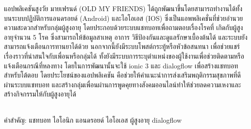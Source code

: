 \begin{thaiabstract}
    แอปพลิเคชันสูงวัย มายเฟรนด์ (OLD MY FRIENDS) ได้ถูกพัฒนาขึ้นโดยสามารถทำงานได้ทั้งบนระบบปฏิบัติการแอนดรอยด์ (Android) และไอโอเอส (IOS) 
    ซึ่งเป็นแอพพลิเคชั่นที่ช่วยอำนวยความสะดวกสำหรับกลุ่มผู้สูงอายุ โดยประกอบด้วยระบบแชทบอทเพื่อถามตอบเรื่องโรคที่
    เกิดกับผู้สูงอายุจำนวน 5 โรค ซึ่งสามารถให้ข้อมูลสาเหตุ อาการ วิธีป้องกันและดูแลรักษาเบื้องต้นได้ 
    และระบบยังสามารถแจ้งเตือนการทานยาได้ด้วย
    นอกจากนี้ยังมีระบบโพสต์กระทู้หรือหัวข้อสนทนา เพื่อช่วยแชร์เรื่องราวที่น่าสนใจกับเพื่อนหรือกลุ่มได้ 
    ทั้งยังมีระบบการระบุตำแหน่งของผู้ใช้งานเพื่อช่วยติดตามหรือแจ้งเตือนกรณีที่หลงทาง โดยในการพัฒนานั้นจะใช้ ionic 3 
    และ dialogflow เพื่อสร้างแชทบอทสำหรับโต้ตอบ โดยประโยชน์ของแอปพลิเคชัน 
    คือช่วยให้คำแนะนำการส่งเสริมพฤติกรรมสุขภาพที่ดีผ่านระบบแชทบอท และสร้างกลุ่มเพื่อนผ่านการพูดคุยทางสังคมออนไลน์ทำให้ช่วยลดความเหงาและสร้างกิจกรรมให้กับผู้สูงอายุได้

\noindent
\\คำสำคัญ: แชทบอท ไอโอนิก แอนดรอยด์ ไอโอเอส ผู้สูงอายุ dialogflow
\end{thaiabstract}
